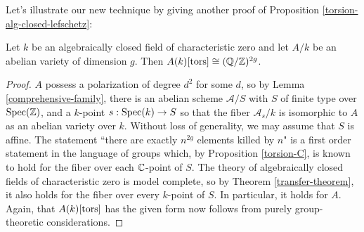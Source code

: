 Let's illustrate our new technique by giving another proof of Proposition \ref{torsion-alg-closed-lefschetz}:

\begin{proposition}
Let $k$ be an algebraically closed field of characteristic zero and let $A/k$ be an abelian variety of dimension $g$. Then $A(k)[\operatorname{tors}]\cong (\mathbb{Q}/\mathbb{Z})^{2g}$.
\end{proposition}
\begin{proof}
\label{torsion-alg-closed-transfer}
$A$ possess a polarization of degree $d^2$ for some $d$, so by Lemma \ref{comprehensive-family}, there is an abelian scheme $\mathcal{A}/S$ with $S$ of finite type over $\operatorname{Spec}(\mathbb{Z})$, and a $k$-point $s:\operatorname{Spec}(k)\rightarrow S$ so that the fiber $\mathcal{A}_s/k$ is isomorphic to $A$ as an abelian variety over $k$. Without loss of generality, we may assume that $S$ is affine. The statement ``there are exactly $n^{2g}$ elements killed by $n$" is a first order statement in the language of groups which, by Proposition \ref{torsion-C}, is known to hold for the fiber over each $\mathbb{C}$-point of $S$. The theory of algebraically closed fields of characteristic zero is model complete, so by Theorem \ref{transfer-theorem}, it also holds for the fiber over every $k$-point of $S$. In particular, it holds for $A$. Again, that $A(k)[\operatorname{tors}]$ has the given form now follows from purely group-theoretic considerations.
\end{proof}